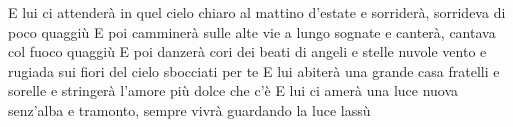 \beginverse
E lui ci attenderà
in quel cielo chiaro al mattino d'estate
e sorriderà, sorrideva di poco quaggiù
E poi camminerà
sulle alte vie a lungo sognate
e canterà, cantava col fuoco quaggiù
\endverse
\beginchorus
E poi danzerà
cori dei beati di angeli e stelle
nuvole vento e rugiada
sui fiori del cielo sbocciati per te
\endchorus
\beginverse
E lui abiterà
una grande casa fratelli e sorelle
e stringerà l'amore più dolce che c'è
E lui ci amerà
una luce nuova senz'alba e tramonto,
sempre vivrà guardando la luce lassù
\endverse
\endsong
